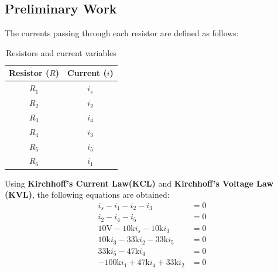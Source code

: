 \documentclass{article}
\begin{document}
\subsection{Preliminary Work}
{
The currents passing through each resistor are defined as follows:\begin{table}[h]
\begin{center}
\begin{tabular}{|c|c|}
\hline 
\textbf{Resistor ($R$)} & \textbf{Current ($i$)}  \\
\hline \hline
$R_1$ & $i_s$  \\ \hline
$R_2$ & $i_2$   \\  \hline
$R_3$ & $i_4$  \\ \hline
$R_4$ & $i_3$  \\ \hline
$R_5$ & $i_5$  \\ \hline
$R_6$ & $i_1$  \\ \hline
\end{tabular}
\caption{Resistors and current variables}
\end{center}
\end{table}

Using \textbf{Kirchhoff's Current Law(KCL)} and \textbf{Kirchhoff's Voltage Law (KVL)}, the following equations are obtained:
\begin{align}
  i_s - i_1 - i_2 - i_3 &= 0 \\  
  i_2 - i_4 - i_5 &= 0 \\  
  10\text{V} - 10\text{k} i_s - 10\text{k} i_3 &= 0 \\  
  10\text{k} i_3 - 33\text{k} i_2 - 33\text{k} i_5 &= 0 \\  
  33\text{k} i_5 - 47\text{k} i_4 &= 0 \\  
  -100\text{k} i_1 + 47\text{k} i_4 + 33\text{k} i_2 &= 0
\end{align}

}
\end{document}
